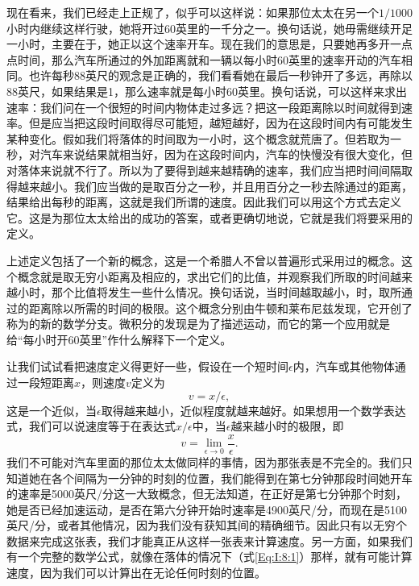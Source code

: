 现在看来，我们已经走上正规了，似乎可以这样说：如果那位太太在另一个$1/1000$小时内继续这样行驶，她将开过60英里的一千分之一。换句话说，她毋需继续开足一小时，主要在于，她正以这个速率开车。现在我们的意思是，只要她再多开一点点时间，那么汽车所通过的外加距离就和一辆以每小时60英里的速率开动的汽车相同。也许每秒88英尺的观念是正确的，我们看看她在最后一秒钟开了多远，再除以88英尺，如果结果是1，那么速率就是每小时60英里。换句话说，可以这样来求出速率：我们问在一个很短的时间内物体走过多远？把这一段距离除以时间就得到速率。但是应当把这段时间取得尽可能短，越短越好，因为在这段时间内有可能发生某种变化。假如我们将落体的时间取为一小时，这个概念就荒唐了。但若取为一秒，对汽车来说结果就相当好，因为在这段时间内，汽车的快慢没有很大变化，但对落体来说就不行了。所以为了要得到越来越精确的速率，我们应当把时间间隔取得越来越小。我们应当做的是取百分之一秒，并且用百分之一秒去除通过的距离，结果给出每秒的距离，这就是我们所谓的速度。因此我们可以用这个方式去定义它。这是为那位太太给出的成功的答案，或者更确切地说，它就是我们将要采用的定义。

上述定义包括了一个新的概念，这是一个希腊人不曾以普遍形式采用过的概念。这个概念就是取无穷小距离及相应的，求出它们的比值，并观察我们所取的时间越来越小时，那个比值将发生一些什么情况。换句话说，当时间越取越小，时，取所通过的距离除以所需的时间的极限。这个概念分别由牛顿和莱布尼兹发现，它开创了称为的新的数学分支。微积分的发现是为了描述运动，而它的第一个应用就是给“每小时开60英里”作什么解释下一个定义。

让我们试试看把速度定义得更好一些，假设在一个短时间$\epsilon$内，汽车或其他物体通过一段短距离$x$，则速度$v$定义为
\begin{equation*}
v=x/\epsilon,
\end{equation*}
这是一个近似，当$\epsilon$取得越来越小，近似程度就越来越好。如果想用一个数学表达式，我们可以说速度等于在表达式$x/\epsilon$中，当$\epsilon$越来越小时的极限，即
\begin{equation}
\label{Eq:I:8:3}
v=\lim_{\epsilon\to0}\frac{x}{\epsilon}.
\end{equation}
我们不可能对汽车里面的那位太太做同样的事情，因为那张表是不完全的。我们只知道她在各个间隔为一分钟的时刻的位置，我们能得到在第七分钟那段时间她开车的速率是5000英尺/分这一大致概念，但无法知道，在正好是第七分钟那个时刻，她是否已经加速运动，是否在第六分钟开始时速率是4900英尺/分，而现在是5100英尺/分，或者其他情况，因为我们没有获知其间的精确细节。因此只有以无穷个数据来完成这张表，我们才能真正从这样一张表来计算速度。另一方面，如果我们有一个完整的数学公式，就像在落体的情况下（式\ref{Eq:I:8:1}）那样，就有可能计算速度，因为我们可以计算出在无论任何时刻的位置。

